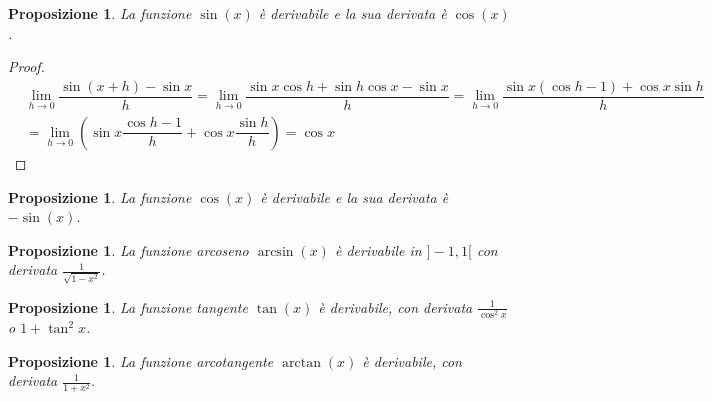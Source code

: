 \documentclass{article}
\theoremstyle{plain}
\newtheorem{prop}[thm]{Proposizione}
\theoremstyle{definition}
\theoremstyle{remark}
\begin{document}
\vspace{10pt}

\begin{bxthm}
\begin{prop}
    La funzione $\sin(x)$ è derivabile e la sua derivata è $\cos(x)$.
\end{prop}
\end{bxthm}
\begin{proof}
    \begin{align*}
        &\lim_{h\to0}\dfrac{\sin(x+h)-\sin x}{h}=\lim_{h\to0}\dfrac{\sin x\cos h+\sin h\cos x-\sin x}{h}=\lim_{h\to0}\dfrac{\sin x(\cos h-1)+\cos x\sin h}{h}\\
        &=\lim_{h\to0}\left(\sin x\dfrac{\cos h-1}{h}+\cos x\dfrac{\sin h}{h}\right)=\cos x
    \end{align*}
\end{proof}

\vspace{10pt}

\begin{bxthm}
\begin{prop}
    La funzione $\cos(x)$ è derivabile e la sua derivata è $-\sin(x)$.
\end{prop}
\end{bxthm}

\vspace{10pt}

\begin{bxthm}
\begin{prop}
    La funzione arcoseno $\arcsin(x)$ è derivabile in $]-1,1[$ con derivata $\frac{1}{\sqrt{1-x^2}}$.
\end{prop}
\end{bxthm}

\vspace{10pt}

\begin{bxthm}
\begin{prop}
    La funzione tangente $\tan(x)$ è derivabile, con derivata $\frac{1}{\cos^2x}$ o $1+\tan^2x$.
\end{prop}
\end{bxthm}

\vspace{10pt}

\begin{bxthm}
\begin{prop}
    La funzione arcotangente $\arctan(x)$ è derivabile, con derivata $\frac{1}{1+x^2}$.
\end{prop}
\end{bxthm}
\end{document}
